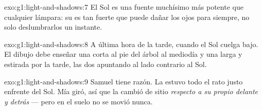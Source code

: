 \begin{solution}{exo:g1:light-and-shadows:7}
El Sol es una fuente muchísimo más potente que cualquier lámpara: su
 es tan fuerte que puede dañar los ojos para siempre, no solo
deslumbrarlos un instante.
\end{solution}

\begin{solution}{exo:g1:light-and-shadows:8}
A última hora de la tarde, cuando el Sol cuelga bajo. El dibujo debe
enseñar una  corta al pie del árbol al mediodía y una 
larga y estirada por la tarde, las dos apuntando al lado contrario al
Sol.
\end{solution}

\begin{solution}{exo:g1:light-and-shadows:9}
Samuel tiene razón. La  estuvo todo el rato justo enfrente
del Sol. Mía giró, así que la  cambió de sitio \emph{respecto
a su propio delante y detrás} --- pero en el suelo no se movió nunca.
\end{solution}
